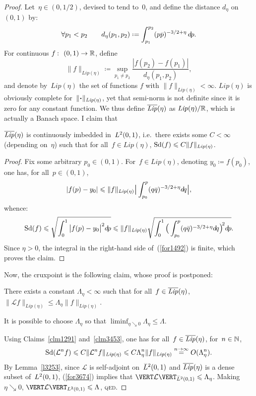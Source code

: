\begin{proof}
Let~$\eta \in (0,1/2)$, devised to tend to~$0$, and define the distance $d_{\eta}$ on~$(0,1)$ by:
\[ \forall p_1 < p_2 \qquad d_{\eta}(p_1,p_2) \coloneqq \int_{p_1}^{p_2} (p\bar{p})^{-3/2+\eta} \,\dx{p} .\]
For continuous $f \colon (0,1)\to\RR$, define
\[ \|f\|_{\mathit{Lip}(\eta)} \coloneqq \sup_{p_1\neq p_2} \frac{|f(p_2)-f(p_1)|}{d_{\eta}(p_1,p_2)} ,\]
and denote by~$\mathit{Lip}(\eta)$ the set of functions $f$ with $\|f\|_{\mathit{Lip}(\eta)} < \infty$.
$\mathit{Lip}(\eta)$ is obviously complete for~$\|\Bcdot\|_{\mathit{Lip}(\eta)}$,
yet that semi-norm is not definite since it is zero for any constant function.
We thus define $\overline{\mathit{Lip}}(\eta)$ as $\mathit{Lip}(\eta)/\mathbb{R}$,
which is actually a Banach space.
I claim that
%
\begin{Clm}\label{clm1291}
$\overline{\mathit{Lip}}(\eta)$ is continuously imbedded in~$\ldb(0,1)$,
i.e.\ there exists some $C<\infty$ (depending on~$\eta$) such that
for all~$f \in \mathit{Lip}(\eta)$, $\operatorname{Sd}(f) \leqslant C \|f\|_{\mathit{Lip}(\eta)}$.
\end{Clm}

\begingroup{}
\begin{proof}
Fix some arbitrary $p_0\in(0,1)$.
For~$f \in \mathit{Lip}(\eta)$, denoting $y_0 \coloneqq f(p_0)$,
one has, for all~$p \in (0,1)$,
\[ | f(p)-y_0 | \leq \|f\|_{\mathit{Lip}(\eta)} \Big| \int_{p_0}^{p} (q\bar{q})^{-3/2+\eta} \dx{q} \Big| ,\]
whence:
\[\label{for1492} \ecty(f) \leq \sqrt{\int_0^1 \big|f(p)-y_0\big|^2 \dx{p}} \leq
\|f\|_{\mathit{Lip}(\eta)}
\sqrt{\int_0^1 \Big( \int_{p_0}^{p} (q\bar{q})^{-3/2+\eta} \dx{q} \Big)^{\!2} \dx{p}}
.\]
Since $\eta>0$, the integral in the right-hand side of~(\ref{for1492}) is finite,
which proves the claim.
\end{proof}\endgroup

Now, the cruxpoint is the following claim, whose proof is postponed:
%
\begin{Clm}\label{clm3453}
\begin{ienumerate}
\item\label{itm6574a} There exists a constant $\Lambda_{\eta}<\infty$ such that
for all~$f \in \overline{\mathit{Lip}}(\eta)$, $\|\mathcal{L}f\|_{\mathit{Lip}(\eta)} \leq \Lambda_{\eta} \|f\|_{\mathit{Lip}(\eta)}$.
\item\label{itm6574b} It is possible to choose $\Lambda_{\eta}$ so that
$\liminf_{\eta\searrow0} \Lambda_{\eta} \leq \Lambda$.
\end{ienumerate}
\end{Clm}

\noindent Using Claims~\ref{clm1291} and~\ref{clm3453},
one has for all~$f \in \overline{\mathit{Lip}}(\eta)$, for~$n\in\mathbb{N}$,
\[\label{for3674}
\operatorname{Sd}(\mathcal{L}^n f) \leqslant C \| \mathcal{L}^n f \|_{\mathit{Lip}(\eta)} \leqslant
C \Lambda_{\eta}^n \|f\|_{\mathit{Lip}(\eta)} \stackrel{n\to\infty}{=} O(\Lambda_{\eta}^n) .\]
%
By Lemma~\ref{l3253}, since $\mathcal{L}$ is self-adjoint on~$\ldb(0,1)$
and $\overline{\mathit{Lip}}(\eta)$ is a dense subset of~$\ldb(0,1)$,
(\ref{for3674}) implies that $\VERT \mathcal{L} \VERT_{\ldb(0,1)} \leq \Lambda_{\eta}$.
Making $\eta \searrow 0$, $\VERT \mathcal{L} \VERT_{\ldb(0,1)} \leq \Lambda$, \textsc{qed}.
\end{proof}

